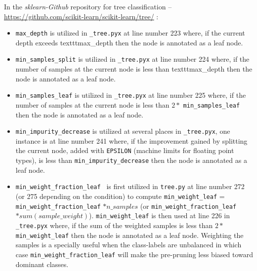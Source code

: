 \documentclass[12pt]{article}
\begin{document}
In the \textit{sklearn-Github} repository for tree classification -- \url{https://github.com/scikit-learn/scikit-learn/tree/} :  
\begin{itemize}
\item \texttt{max\_depth} is utilized in \texttt{\_tree.pyx} at line number 223 where, if the current depth exceeds texttt{max\_depth} then the node is annotated as a leaf node.

\item \texttt{min\_samples\_split} is utilized in \texttt{\_tree.pyx} at line number 224 where, if the number of samples at the current node is less than texttt{max\_depth} then the node is annotated as a leaf node.

\item \texttt{min\_samples\_leaf} is utilized in \texttt{\_tree.pyx} at line number 225 where, if the number of samples at the current node is less than $2 *$ \texttt{min\_samples\_leaf} then the node is annotated as a leaf node.

\item \texttt{min\_impurity\_decrease} is utilized at several places in \texttt{\_tree.pyx}, one instance is at line number 241 where, if the improvement gained by splitting the current node, added with \texttt{EPSILON} (machine limits for floating point types), is less than \texttt{min\_impurity\_decrease} then the node is annotated as a leaf node.

\item \texttt{min\_weight\_fraction\_leaf } is first utilized in \texttt{tree.py} at line number 272 (or 275 depending on the condition) to compute \texttt{min\_weight\_leaf} = \texttt{min\_weight\_fraction\_leaf} $* n\_samples$ (or \texttt{min\_weight\_fraction\_leaf} $* sum(sample\_weight)$). \texttt{min\_weight\_leaf} is then used at line 226 in \texttt{\_tree.pyx} where, if the sum of the weighted samples is less than $2 *$ \texttt{min\_weight\_leaf} then the node is annotated as a leaf node. Weighting the samples is a specially useful when the class-labels are unbalanced in which case \texttt{min\_weight\_fraction\_leaf} will make the pre-pruning less biased toward dominant classes.
\end{itemize}
\end{document}
